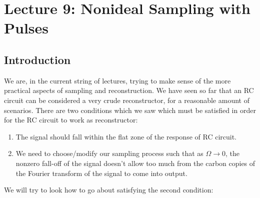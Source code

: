 \section{Lecture 9: Nonideal Sampling with Pulses}



\subsection{Introduction}
We are, in the current string of lectures, trying to make sense of the more practical aspects of sampling and reconstruction. We have seen so far that an RC circuit can be considered a very crude reconstructor, for a reasonable amount of scenarios. There are two conditions which we saw which must be satisfied in order for the RC circuit to work as reconstructor:
\begin{enumerate}
\item The signal should fall within the flat zone of the response of RC circuit.
\item We need to choose/modify our sampling process such that as $\Omega\rightarrow0$, the nonzero fall-off of the signal doesn't allow too much from the carbon copies of the Fourier transform of the signal to come into output.
\end{enumerate}
We will try to look how to go about satisfying the second condition:

